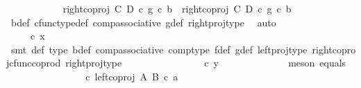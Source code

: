 \begin{isabellebody}
\ \ \ \ \ \ \ \ \ \ \isamarkupfalse%
\ {\isachardoublequoteopen}right{\isacharunderscore}{\kern0pt}coproj\ C\ D\ {\isasymcirc}\isactrlsub c\ {\isacharparenleft}{\kern0pt}g\ {\isasymcirc}\isactrlsub c\ b{\isacharparenright}{\kern0pt}\ {\isacharequal}{\kern0pt}\ {\isacharparenleft}{\kern0pt}right{\isacharunderscore}{\kern0pt}coproj\ C\ D\ {\isasymcirc}\isactrlsub c\ g{\isacharparenright}{\kern0pt}\ {\isasymcirc}\isactrlsub c\ b{\isachardoublequoteclose}\isanewline
\ \ \ \ \ \ \ \ \ \ \ \ \isamarkupfalse%
\ b{\isacharunderscore}{\kern0pt}def\ cfunc{\isacharunderscore}{\kern0pt}type{\isacharunderscore}{\kern0pt}def\ comp{\isacharunderscore}{\kern0pt}associative\ g{\isacharunderscore}{\kern0pt}def\ right{\isacharunderscore}{\kern0pt}proj{\isacharunderscore}{\kern0pt}type\ \isamarkupfalse%
\ auto\isanewline
\ \ \ \ \ \ \ \ \ \ \isamarkupfalse%
\ \isamarkupfalse%
\ {\isachardoublequoteopen}{\isachardot}{\kern0pt}{\isachardot}{\kern0pt}{\isachardot}{\kern0pt}\ \ {\isacharequal}{\kern0pt}\ {\isasymphi}\ {\isasymcirc}\isactrlsub c\ x{\isachardoublequoteclose}\isanewline
\ \ \ \ \ \ \ \ \ \ \ \ \isamarkupfalse%
\ {\isacharparenleft}{\kern0pt}smt\ {\isasymphi}{\isacharunderscore}{\kern0pt}def\ {\isasymphi}{\isacharunderscore}{\kern0pt}type\ b{\isacharunderscore}{\kern0pt}def\ comp{\isacharunderscore}{\kern0pt}associative{}\ comp{\isacharunderscore}{\kern0pt}type\ f{\isacharunderscore}{\kern0pt}def{\isacharparenleft}{\kern0pt}{}{\isacharparenright}{\kern0pt}\ g{\isacharunderscore}{\kern0pt}def{\isacharparenleft}{\kern0pt}{}{\isacharparenright}{\kern0pt}\ left{\isacharunderscore}{\kern0pt}proj{\isacharunderscore}{\kern0pt}type\ right{\isacharunderscore}{\kern0pt}coproj{\isacharunderscore}{\kern0pt}cfunc{\isacharunderscore}{\kern0pt}coprod\ right{\isacharunderscore}{\kern0pt}proj{\isacharunderscore}{\kern0pt}type{\isacharparenright}{\kern0pt}\isanewline
\ \ \ \ \ \ \ \ \ \ \isamarkupfalse%
\ \isamarkupfalse%
\ {\isachardoublequoteopen}{\isachardot}{\kern0pt}{\isachardot}{\kern0pt}{\isachardot}{\kern0pt}\ {\isacharequal}{\kern0pt}\ {\isasymphi}\ {\isasymcirc}\isactrlsub c\ y{\isachardoublequoteclose}\isanewline
\ \ \ \ \ \ \ \ \ \ \ \ \isamarkupfalse%
\ {\isacharparenleft}{\kern0pt}meson\ equals{\isacharparenright}{\kern0pt}\isanewline
\ \ \ \ \ \ \ \ \ \ \isamarkupfalse%
\ \isamarkupfalse%
\ {\isachardoublequoteopen}{\isachardot}{\kern0pt}{\isachardot}{\kern0pt}{\isachardot}{\kern0pt}\ {\isacharequal}{\kern0pt}\ {\isacharparenleft}{\kern0pt}{\isasymphi}\ {\isasymcirc}\isactrlsub c\ left{\isacharunderscore}{\kern0pt}coproj\ A\ B{\isacharparenright}{\kern0pt}\ {\isasymcirc}\isactrlsub c\ a{\isacharprime}{\kern0pt}{\isachardoublequoteclose}\isanewline

\end{isabellebody}
